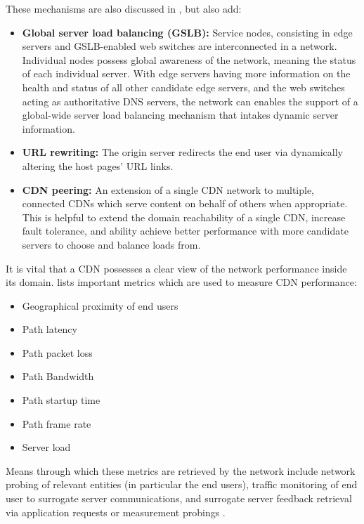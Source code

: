     These mechanisms are also discussed in \cite{cdn-survey}, but also add:

\begin{itemize}
    \item \textbf{Global server load balancing (GSLB):} Service nodes, consisting in edge servers and GSLB-enabled web switches are interconnected in a network.
        Individual nodes possess global awareness of the network, meaning the status of each individual server.
        With edge servers having more information on the health and status of all other candidate edge servers, and the web switches acting as authoritative DNS servers, the network can enables the support of a global-wide server load balancing mechanism that intakes dynamic server information.
    \item \textbf{URL rewriting:} The origin server redirects the end user via dynamically altering the host pages' URL links.
    \item \textbf{CDN peering:} An extension of a single CDN network to multiple, connected CDNs which serve content on behalf of others when appropriate.
        This is helpful to extend the domain reachability of a single CDN, increase fault tolerance, and ability achieve better performance with more candidate servers to choose and balance loads from.
\end{itemize}

    It is vital that a CDN possesses a clear view of the network performance inside its domain.
    \cite{cdn-survey} lists important metrics which are used to measure CDN performance:

    \begin{itemize}
        \item Geographical proximity of end users
        \item Path latency
        \item Path packet loss
        \item Path Bandwidth
        \item Path startup time
        \item Path frame rate
        \item Server load
    \end{itemize}

    Means through which these metrics are retrieved by the network include network probing of relevant entities (in particular the end users), traffic monitoring of end user to surrogate server communications, and surrogate server feedback retrieval via application requests or measurement probings \cite{cdn-survey} \cite{akamai-report}.

